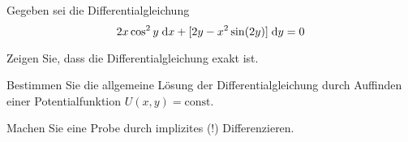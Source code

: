 \begin{atiTask}[
  title = Exakte Differentialgleichung
]
  Gegeben sei die Differentialgleichung
  \begin{equation*}
  2x\cos^2y\;\mathrm{d} x+ [2y-x^2\sin(2y)]\;\mathrm{d} y=0
  \end{equation*}
  \begin{atiSubtasks}
  \item Zeigen Sie, dass die Differentialgleichung exakt ist.
  \item Bestimmen Sie die allgemeine Lösung der Differentialgleichung durch Auffinden einer Potentialfunktion $U(x,y)=\text{const}$.
  \item Machen Sie eine Probe durch implizites (!) Differenzieren.
  \end{atiSubtasks}
  
\end{atiTask}
%
